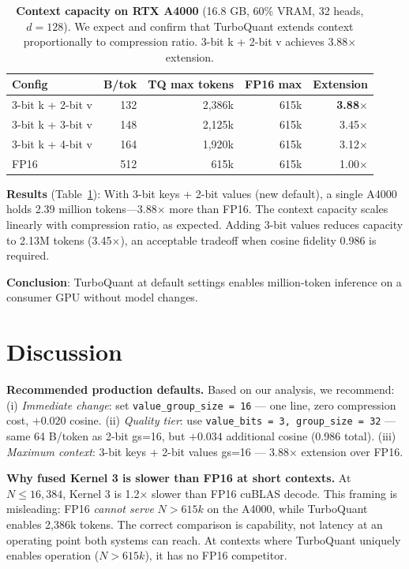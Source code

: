 \documentclass{article}
\begin{document}
\begin{table}[h]
\centering
\caption{\textbf{Context capacity on RTX A4000} (16.8 GB, 60\% VRAM, 32 heads, $d=128$). We expect and confirm that TurboQuant extends context proportionally to compression ratio. 3-bit k + 2-bit v achieves 3.88$\times$ extension.}
\label{tab:capacity}
\begin{tabular}{lrrrr}
\toprule
\textbf{Config} & \textbf{B/tok} & \textbf{TQ max tokens} & \textbf{FP16 max} & \textbf{Extension} \\
\midrule
3-bit k + 2-bit v & 132 & 2,386k & 615k & \textbf{3.88$\times$} \\
3-bit k + 3-bit v & 148 & 2,125k & 615k & 3.45$\times$ \\
3-bit k + 4-bit v & 164 & 1,920k & 615k & 3.12$\times$ \\
FP16              & 512 &   615k & 615k & 1.00$\times$ \\
\bottomrule
\end{tabular}
\end{table}

\textbf{Results} (Table~\ref{tab:capacity}): With 3-bit keys + 2-bit values (new default), a single A4000 holds 2.39 million tokens—3.88$\times$ more than FP16. The context capacity scales linearly with compression ratio, as expected. Adding 3-bit values reduces capacity to 2.13M tokens (3.45$\times$), an acceptable tradeoff when cosine fidelity 0.986 is required.

\textbf{Conclusion}: TurboQuant at default settings enables million-token inference on a consumer GPU without model changes.


\section{Discussion}
\label{sec:discussion}

\textbf{Recommended production defaults.}
Based on our analysis, we recommend:
(i) \textit{Immediate change}: set \texttt{value\_group\_size = 16} — one line, zero compression cost, $+0.020$ cosine.
(ii) \textit{Quality tier}: use \texttt{value\_bits = 3, group\_size = 32} — same 64 B/token as 2-bit gs=16, but $+0.034$ additional cosine (0.986 total).
(iii) \textit{Maximum context}: 3-bit keys + 2-bit values gs=16 — 3.88$\times$ extension over FP16.

\textbf{Why fused Kernel 3 is slower than FP16 at short contexts.}
At $N \leq 16{,}384$, Kernel 3 is 1.2$\times$ slower than FP16 cuBLAS decode. This framing is misleading: FP16 \emph{cannot serve} $N > 615k$ on the A4000, while TurboQuant enables 2,386k tokens. The correct comparison is capability, not latency at an operating point both systems can reach. At contexts where TurboQuant uniquely enables operation ($N > 615k$), it has no FP16 competitor.
\end{document}
